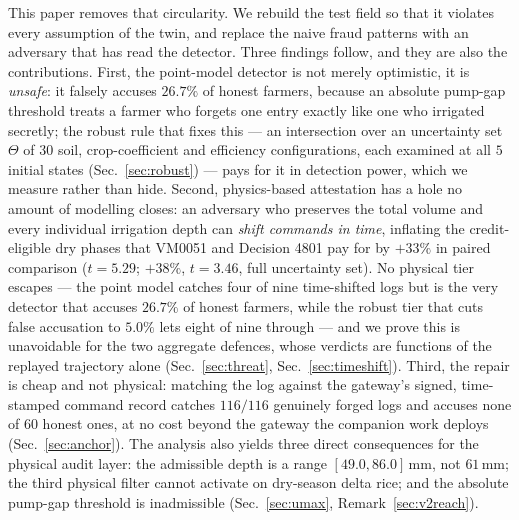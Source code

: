 This paper removes that circularity. We rebuild the test field so that it violates every assumption of the twin, and replace the
naive fraud patterns with an adversary that has read the detector. Three
findings follow, and they are also the contributions. First, the point-model
detector is not merely optimistic, it is \emph{unsafe}: it falsely accuses
$26.7\%$ of honest farmers, because an absolute pump-gap threshold treats a
farmer who forgets one entry exactly like one who irrigated secretly; the
robust rule that fixes this --- an intersection over an uncertainty set
$\Theta$ of $30$ soil, crop-coefficient and efficiency configurations, each
examined at all $5$ initial states (Sec.~\ref{sec:robust}) --- pays for it in
detection power, which we measure rather than hide. Second, physics-based attestation has a hole no amount of
modelling closes: an adversary who preserves the total volume and every
individual irrigation depth can \emph{shift commands in time}, inflating the
credit-eligible dry phases that VM0051 and Decision 4801 pay for by $+33\%$
in paired comparison ($t=5.29$; $+38\%$, $t=3.46$, full uncertainty set). No
physical tier escapes --- the point model catches four of nine time-shifted logs but
is the very detector that accuses $26.7\%$ of honest farmers, while the robust
tier that cuts false accusation to $5.0\%$ lets eight of nine through --- and
we prove this is unavoidable for the two aggregate defences, whose verdicts are
functions of the replayed trajectory alone (Sec.~\ref{sec:threat},
Sec.~\ref{sec:timeshift}).
Third, the repair is cheap and not physical: matching the log against the
gateway's signed, time-stamped command record catches $116/116$ genuinely
forged logs and accuses none of $60$ honest ones, at no cost beyond the gateway
the companion work deploys (Sec.~\ref{sec:anchor}). The analysis also yields three direct consequences for the physical audit layer: the admissible depth is a range $[49.0,86.0]$\,mm, not $61$\,mm; the third physical filter cannot activate on dry-season delta rice; and the absolute pump-gap threshold is inadmissible
(Sec.~\ref{sec:umax}, Remark~\ref{sec:v2reach}).
